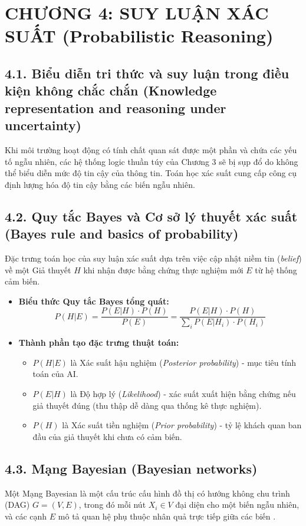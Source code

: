 \documentclass[11pt,a4paper]{article}
\begin{document}
\section{CHƯƠNG 4: SUY LUẬN XÁC SUẤT (Probabilistic Reasoning)}

\subsection{4.1. Biểu diễn tri thức và suy luận trong điều kiện không chắc chắn (Knowledge representation and reasoning under uncertainty)}
Khi môi trường hoạt động có tính chất quan sát được một phần và chứa các yếu tố ngẫu nhiên, các hệ thống logic thuần túy của Chương 3 sẽ bị sụp đổ do không thể biểu diễn mức độ tin cậy của thông tin. Toán học xác suất cung cấp công cụ định lượng hóa độ tin cậy bằng các biến ngẫu nhiên.

\subsection{4.2. Quy tắc Bayes và Cơ sở lý thuyết xác suất (Bayes rule and basics of probability)}
Đặc trưng toán học của suy luận xác suất dựa trên việc cập nhật niềm tin (\textit{belief}) về một Giả thuyết $H$ khi nhận được bằng chứng thực nghiệm mới $E$ từ hệ thống cảm biến.
\begin{itemize}
    \item \textbf{Biểu thức Quy tắc Bayes tổng quát:}
    \begin{equation}
        P(H | E) = \frac{P(E | H) \cdot P(H)}{P(E)} = \frac{P(E | H) \cdot P(H)}{\sum_{i} P(E | H_i) \cdot P(H_i)}
    \end{equation}
    \item \textbf{Thành phần tạo đặc trưng thuật toán:}
    \begin{itemize}
        \item $P(H | E)$ là Xác suất hậu nghiệm (\textit{Posterior probability}) - mục tiêu tính toán của AI.
        \item $P(E | H)$ là Độ hợp lý (\textit{Likelihood}) - xác suất xuất hiện bằng chứng nếu giả thuyết đúng (thu thập dễ dàng qua thống kê thực nghiệm).
        \item $P(H)$ là Xác suất tiền nghiệm (\textit{Prior probability}) - tỷ lệ khách quan ban đầu của giả thuyết khi chưa có cảm biến.
    \end{itemize}
\end{itemize}

\subsection{4.3. Mạng Bayesian (Bayesian networks)}
Một Mạng Bayesian là một cấu trúc cấu hình đồ thị có hướng không chu trình (DAG) $G=(V,E)$, trong đó mỗi nút $X_i \in V$ đại diện cho một biến ngẫu nhiên, và các cạnh $E$ mô tả quan hệ phụ thuộc nhân quả trực tiếp giữa các biến \cite{mutzari2025defending}.
\end{document}
